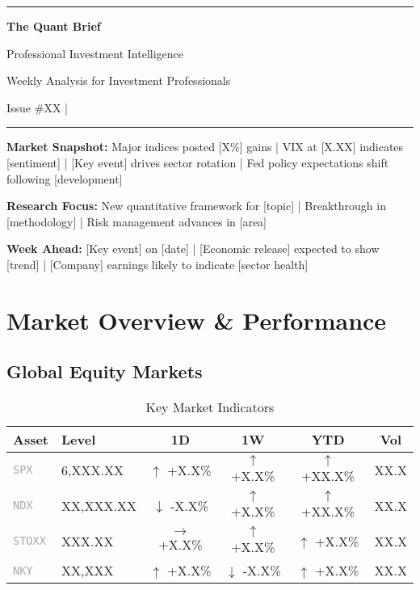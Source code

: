 \documentclass[11pt,a4paper]{article}
\makeatletter
\newcommand{\ticker}[1]{\texttt{\textcolor{darkgray}{#1}}}
\newcommand{\up}[1]{\textcolor{successgreen}{$\uparrow$ #1}}
\newcommand{\down}[1]{\textcolor{dangerred}{$\downarrow$ #1}}
\newcommand{\flat}[1]{\textcolor{mediumgray}{$\rightarrow$ #1}}
\newenvironment{markettable}[1][Key Market Indicators]{%
    \begin{table}[h]
    \centering
    \caption{#1}
    \footnotesize
    \renewcommand{\arraystretch}{1.2}
    \begin{tabular}{@{}llcccc@{}}
    \toprule
    \rowcolor{primaryblue!10}
    \textbf{Asset} & \textbf{Level} & \textbf{1D} & \textbf{1W} & \textbf{YTD} & \textbf{Vol} \\
    \midrule
}{%
    \bottomrule
    \end{tabular}
    \end{table}
}
\newcommand{\titleheader}{%
    \begin{center}
        \color{primaryblue}
        \rule{\textwidth}{2pt}
        \vspace{0.3cm}
        
        {\Huge\textbf{The Quant Brief}}
        
        \vspace{0.2cm}
        {\Large Professional Investment Intelligence}
        
        \vspace{0.3cm}
        \color{darkgray}
        {\large Weekly Analysis for Investment Professionals}
        
        \vspace{0.2cm}
        \color{mediumgray}
        {\normalsize Issue \#XX | \DTMtoday}
        
        \vspace{0.3cm}
        \color{primaryblue}
        \rule{\textwidth}{2pt}
    \end{center}
}
\makeatother
\begin{document}
\thispagestyle{empty}
\titleheader

\vspace{1cm}

\begin{highlights}
\textbf{Market Snapshot:} Major indices posted [X\%] gains | VIX at [X.XX] indicates [sentiment] | [Key event] drives sector rotation | Fed policy expectations shift following [development]

\textbf{Research Focus:} New quantitative framework for [topic] | Breakthrough in [methodology] | Risk management advances in [area]

\textbf{Week Ahead:} [Key event] on [date] | [Economic release] expected to show [trend] | [Company] earnings likely to indicate [sector health]
\end{highlights}

\vspace{0.5cm}

\begin{execsummary}
\end{execsummary}

\newpage


\section{Market Overview \& Performance}

\subsection{Global Equity Markets}

\begin{markettable}
\ticker{SPX} & 6,XXX.XX & \up{+X.X\%} & \up{+X.X\%} & \up{+XX.X\%} & XX.X \\
\rowcolor{tablealternate}
\ticker{NDX} & XX,XXX.XX & \down{-X.X\%} & \up{+X.X\%} & \up{+XX.X\%} & XX.X \\
\ticker{STOXX} & XXX.XX & \flat{+X.X\%} & \up{+X.X\%} & \up{+X.X\%} & XX.X \\
\rowcolor{tablealternate}
\ticker{NKY} & XX,XXX & \up{+X.X\%} & \down{-X.X\%} & \up{+X.X\%} & XX.X \\
\end{markettable}
\end{document}
